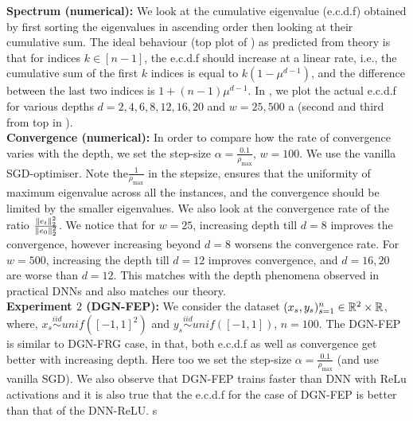 \textbf{Spectrum (numerical):} We look at the cumulative eigenvalue (e.c.d.f) obtained by first sorting the eigenvalues in ascending order then looking at their cumulative sum. The ideal behaviour (top plot of ) as predicted from theory is that for indices $k\in[n-1]$, the e.c.d.f should increase at a linear rate, i.e., the cumulative sum of the first $k$ indices is equal to $k(1-\mu^{d-1})$, and the difference between the last two indices is $1+(n-1)\mu^{d-1}$. In , we plot the actual e.c.d.f for various depths $d=2,4,6,8,12,16,20$ and $w=25,500$ a (second and third from top in ). \hfill\\
\textbf{Convergence (numerical):} In order to compare how the rate of convergence varies with the depth, we set the step-size $\alpha=\frac{0.1}{\rho_{\max}}$, $w=100$. We use the vanilla SGD-optimiser. Note the$ \frac{1}{\rho_{\max}}$ in the stepsize, ensures that the uniformity of maximum eigenvalue across all the instances, and the convergence should be limited by the smaller eigenvalues. We also look at the convergence rate of the ratio $\frac{\|e_t\|^2_2}{\|e_0\|^2_2}$. We notice that for $w=25$, increasing depth till $d=8$ improves the convergence, however increasing beyond $d=8$ worsens the convergence rate. For $w=500$, increasing the depth till $d=12$ improves convergence, and $d=16,20$ are worse than $d=12$.  This matches with the depth phenomena observed in practical DNNs and also matches our theory.\\
\textbf{Experiment $2$ (DGN-FEP):} We consider the dataset $(x_s,y_s)_{s=1}^{n}\in \mathbb{R}^2\times \mathbb{R}$, where, $x_s\stackrel{iid}\sim unif(\left[-1,1\right]^2)$ and $y_s\stackrel{iid}\sim unif([-1,1])$, $n=100$. The DGN-FEP is similar to DGN-FRG case, in that, both e.c.d.f as well as convergence get better with increasing depth. Here too we set the step-size $\alpha=\frac{0.1}{\rho_{\max}}$ (and use vanilla SGD). We also observe that DGN-FEP trains faster than DNN with ReLu activations and it is also true that the e.c.d.f for the case of  DGN-FEP is better than that of the DNN-ReLU. s

